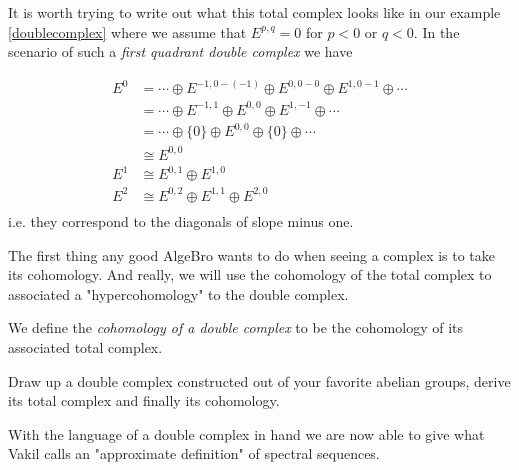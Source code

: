 \begin{example}
It is worth trying to write out what this total complex looks like in our example \ref{doublecomplex} where we assume that $E^{p,q}=0$ for $p< 0$ or $q<0$. In the scenario of such a \textit{first quadrant double complex} we have

\begin{align*}
    E^0 & = \cdots \oplus E^{-1, 0-(-1)}\oplus E^{0,0-0} \oplus E^{1, 0-1} \oplus \cdots \\
    & = \cdots \oplus E^{-1, 1}\oplus E^{0,0} \oplus E^{1, -1} \oplus \cdots \\
    &= \cdots\oplus  \{0\}\oplus E^{0,0}\oplus \{0\} \oplus \cdots\\
    &\cong E^{0,0} \\
    E^1 &\cong E^{0,1}\oplus E^{1,0}\\
    E^2 &\cong E^{0,2}\oplus E^{1,1}\oplus E^{2,0}\\
\end{align*}
i.e. they correspond to the diagonals of slope minus one. 

\end{example}

The first thing any good AlgeBro wants to do when seeing a complex is to take its cohomology. And really, we will use the cohomology of the total complex to associated a "hypercohomology" to the double complex.

\begin{definition}
    We define the \textit{cohomology of a double complex} to be the cohomology of its associated total complex. 
\end{definition}

\begin{exercise}
    Draw up a double complex constructed out of your favorite abelian groups, derive its total complex and finally its cohomology.
\end{exercise}

With the language of a double complex in hand we are now able to give what Vakil calls an "approximate definition" of spectral sequences. 

